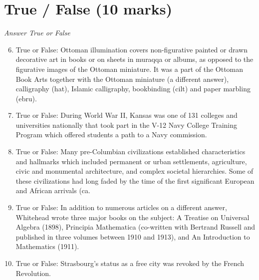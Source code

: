 \documentclass[12pt]{article}
\begin{document}
\section*{True / False (10 marks)}
\textit{Answer True or False}
\begin{enumerate}[label=\arabic*.]
\setcounter{enumi}{5}
\item True or False: Ottoman illumination covers non-figurative painted or drawn decorative art in books or on sheets in muraqqa or albums, as opposed to the figurative images of the Ottoman miniature. It was a part of the Ottoman Book Arts together with the Ottoman miniature (a different answer), calligraphy (hat), Islamic calligraphy, bookbinding (cilt) and paper marbling (ebru).
\item True or False: During World War II, Kansas was one of 131 colleges and universities nationally that took part in the V-12 Navy College Training Program which offered students a path to a Navy commission.
\item True or False: Many pre-Columbian civilizations established characteristics and hallmarks which included permanent or urban settlements, agriculture, civic and monumental architecture, and complex societal hierarchies. Some of these civilizations had long faded by the time of the first significant European and African arrivals (ca.
\item True or False: In addition to numerous articles on a different answer, Whitehead wrote three major books on the subject: A Treatise on Universal Algebra (1898), Principia Mathematica (co-written with Bertrand Russell and published in three volumes between 1910 and 1913), and An Introduction to Mathematics (1911).
\item True or False: Strasbourg's status as a free city was revoked by the French Revolution.
\end{enumerate}
\end{document}
